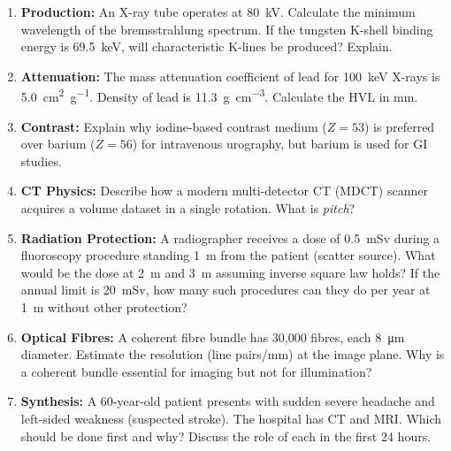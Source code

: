 \documentclass[11pt]{article}
\begin{document}
\begin{exercice}
\begin{enumerate}
    \item \textbf{Production:} An X-ray tube operates at \SI{80}{kV}. Calculate the minimum wavelength of the bremsstrahlung spectrum. If the tungsten K-shell binding energy is \SI{69.5}{keV}, will characteristic K-lines be produced? Explain.
    \item \textbf{Attenuation:} The mass attenuation coefficient of lead for \SI{100}{keV} X-rays is \SI{5.0}{cm^2.g^{-1}}. Density of lead is \SI{11.3}{g.cm^{-3}}. Calculate the HVL in mm.
    \item \textbf{Contrast:} Explain why iodine-based contrast medium ($Z=53$) is preferred over barium ($Z=56$) for intravenous urography, but barium is used for GI studies.
    \item \textbf{CT Physics:} Describe how a modern multi-detector CT (MDCT) scanner acquires a volume dataset in a single rotation. What is \emph{pitch}?
    \item \textbf{Radiation Protection:} A radiographer receives a dose of \SI{0.5}{mSv} during a fluoroscopy procedure standing \SI{1}{m} from the patient (scatter source). What would be the dose at \SI{2}{m} and \SI{3}{m} assuming inverse square law holds? If the annual limit is \SI{20}{mSv}, how many such procedures can they do per year at \SI{1}{m} without other protection?
    \item \textbf{Optical Fibres:} A coherent fibre bundle has 30,000 fibres, each \SI{8}{\micro\metre} diameter. Estimate the resolution (line pairs/mm) at the image plane. Why is a coherent bundle essential for imaging but not for illumination?
    \item \textbf{Synthesis:} A 60-year-old patient presents with sudden severe headache and left-sided weakness (suspected stroke). The hospital has CT and MRI. Which should be done first and why? Discuss the role of each in the first 24 hours.
\end{enumerate}
\end{exercice}
\end{document}
